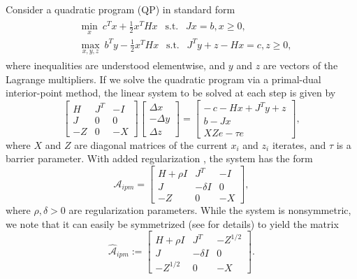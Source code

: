 \documentclass{article}
\newcommand{\sA}{\mathcal{A}}
\begin{document}
Consider a quadratic program (QP) in standard form \cite[Chapter 16]{nw06}
\begin{align}
	\begin{split}
	\label{eq:qp_std_form}
	&\min_x \ c^T x + \frac{1}{2}x^T H x \ \ \textrm{ s.t. } \ \ Jx = b, x \ge 0,\\
	&\max_{x, y, z} \ b^T y - \frac{1}{2} x^T H x \ \ \textrm{ s.t. } \ \ J^T y + z -Hx = c, z \ge 0,
	\end{split}
\end{align}
where inequalities are understood elementwise, and $y$ and $z$ are vectors of the Lagrange multipliers. If we solve the quadratic program via a primal-dual interior-point method, the linear system to be solved at each step is given by \cite{gmo14}
\[
\begin{bmatrix}
H & J^{T} & -I \\
J & 0 & 0 \\
-Z & 0 & -X
\end{bmatrix}
\begin{bmatrix}
\Delta x \\[2pt]
-\Delta y \\[2pt]
\Delta z
\end{bmatrix}
=
\begin{bmatrix}
-\,c - Hx + J^{T}y + z \\[2pt]
b - Jx \\[2pt]
XZe - \tau e
\end{bmatrix},
\]
where $X$ and $Z$ are diagonal matrices of the current $x_i$ and $z_i$ iterates, and $\tau$ is a barrier parameter. With added regularization \cite{fo12}, the system has the form
\[
\sA_{ipm} = \begin{bmatrix}
H+\rho I & J^{T} & -I \\
J & -\delta I & 0 \\
-Z & 0 & -X
\end{bmatrix},
\]
where $\rho, \delta > 0$ are regularization parameters. While the system is nonsymmetric, we note that it can easily be symmetrized (see \cite{gmo14} for details) to yield the matrix
\[
\hat{\sA}_{ipm} :=  \begin{bmatrix}
H+\rho I & J^{T} & -Z^{1/2} \\
J & -\delta I & 0 \\
-Z ^{1/2} & 0 & -X
\end{bmatrix}.
\]
\end{document}
